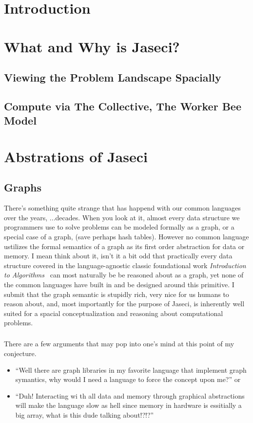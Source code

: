\documentclass{book}
\begin{document}
\chapter{Introduction}


\chapter{What and Why is Jaseci?}
\section{Viewing the Problem Landscape Spacially}
\section{Compute via The Collective, The Worker Bee Model}

\chapter{Abstrations of Jaseci}
\section{Graphs}
There's something quite strange that has happend with our \gls{common languages} over the years, ...decades. When you look at it, almost every data structure we programmers use to solve problems can be modeled formally as a graph, or a special case of a graph, (save perhaps hash tables). However no common language ustilizes the formal semantics of a graph as its first order abstraction for data or memory. I mean think about it, isn't it a bit odd that practically every data structure covered in the language-agnostic classic foundational work \textit{Introduction to Algorithms}~\cite{intro_to_algo} can most naturally be be reasoned about as a graph, yet none of the common languages have built in and be designed around this primitive. I submit that the graph semantic is stupidly rich, very nice for us humans to reason about, and, most importantly for the purpose of Jaseci, is inherently well suited for a spacial conceptualization and reasoning about computational problems.
\paragraph{}
There are a few arguments that may pop into one's mind at this point of my conjecture.
\begin{itemize}
    \item ``Well there are graph libraries in my favorite language that implement graph symantics, why would I need a language to force the concept upon me?''
          or
    \item ``Duh! Interacting wi th all data and memory through graphical abstractions will make the language slow as hell since memory in hardware is essitially a big array, what is this dude talking about!?!?''
\end{itemize}
\end{document}
